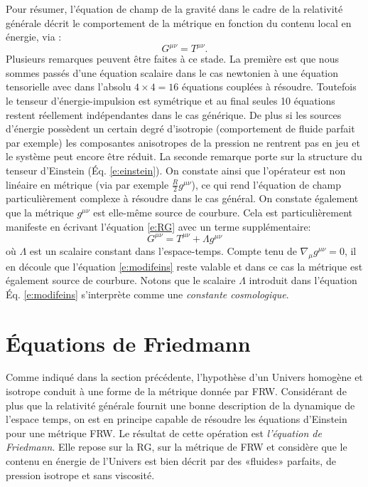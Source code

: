 Pour résumer, l'équation de champ de la gravité dans le cadre de la relativité générale décrit le comportement de la métrique en fonction du contenu local en énergie, via :
\begin{equation}
G^{\mu\nu}=T^{\mu\nu}.
\label{e:RG}
\end{equation}
Plusieurs remarques peuvent être faites à ce stade. La première est que nous sommes passés d'une équation scalaire dans le cas newtonien à une équation tensorielle avec dans l'absolu $ 4\times 4=16$ équations couplées à résoudre. Toutefois le tenseur d'énergie-impulsion est symétrique et au final seules 10 équations restent réellement indépendantes dans le cas générique. De plus si les sources d'énergie possèdent un certain degré d'isotropie (comportement de fluide parfait par exemple) les composantes anisotropes de la pression ne rentrent pas en jeu et le système peut encore être réduit. La seconde remarque porte sur la structure du tenseur d'Einstein (Éq. \ref{e:einstein}). On constate ainsi que l'opérateur est non linéaire  en métrique (via par exemple $\frac{R}{2}g^{\mu\nu}$), ce qui rend l'équation de champ particulièrement complexe à résoudre dans le cas général. On constate également que la métrique $g^{\mu\nu}$ est elle-même source de courbure. Cela est particulièrement manifeste en écrivant l'équation \ref{e:RG} avec un terme supplémentaire:
\begin{equation}
G^{\mu\nu}=T^{\mu\nu}+\Lambda g^{\mu\nu}
\label{e:modifeins}
\end{equation}
où $\Lambda$ est un scalaire constant dans l'espace-temps. Compte tenu de $\nabla_\mu g^{\mu \nu}=0$, il en découle que l'équation \ref{e:modifeins} reste valable et dans ce cas  la métrique est également source de courbure. Notons que le scalaire $\Lambda$ introduit dans l'équation Éq. \ref{e:modifeins} s'interprète comme une \textit{constante cosmologique}.

\section{Équations de Friedmann}
Comme indiqué dans la section précédente, l'hypothèse d'un Univers homogène et isotrope conduit à une forme de la métrique donnée par FRW. Considérant de plus que la relativité générale fournit une bonne description de la dynamique de l'espace temps, on est en principe capable de résoudre les équations d'Einstein pour une métrique FRW. Le résultat de cette opération est \textit{l'équation de Friedmann}. Elle repose sur la RG, sur la métrique de FRW et considère que le contenu en énergie de l'Univers est bien décrit par des «fluides» parfaits, de pression isotrope et sans viscosité.

